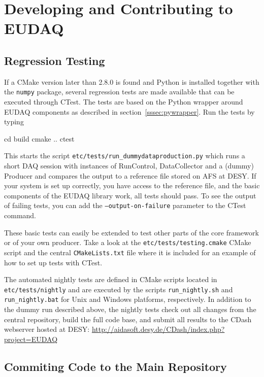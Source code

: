 \section{Developing and Contributing to EUDAQ}
\label{sec:contributing}

\subsection{Regression Testing}
\label{sec:ctest}

If a CMake version later than 2.8.0 is found and Python is installed
together with the \texttt{numpy} package, several regression tests are made
available that can be executed through CTest. The tests are based on
the Python wrapper around EUDAQ components as described in
section~\ref{sssec:pywrapper}. Run the tests by typing

\begin{listing}[mybash]
  cd build
  cmake ..
  ctest
\end{listing}

This starts the script \texttt{etc/tests/run\_dummydataproduction.py}
which runs a short DAQ session with instances of RunControl,
DataCollector and a (dummy) Producer and compares the output to a
reference file stored on AFS at DESY. If your system is set up
correctly, you have access to the reference file, and the basic
components of the EUDAQ library work, all tests should pass.
To see the output of failing tests, you can add the
\texttt{--output-on-failure} parameter to the CTest command.

These basic tests can easily be extended to test other parts of the
core framework or of your own producer. Take a look at the
\texttt{etc/tests/testing.cmake} CMake script and the central
\texttt{CMakeLists.txt} file where it is included for an example of
how to set up tests with CTest.

The automated nightly tests are defined in CMake scripts located in
\texttt{etc/tests/nightly} and are executed by the scripts
\texttt{run\_nightly.sh} and \texttt{run\_nightly.bat} for Unix and
Windows platforms, respectively. In addition to the dummy run
described above, the nightly tests check out all changes from the
central repository, build the full code base, and submit all results
to the CDash webserver hosted at DESY: \url{http://aidasoft.desy.de/CDash/index.php?project=EUDAQ}

\subsection{Commiting Code to the Main Repository}
\label{sec:commiting}



